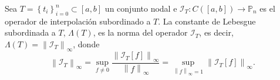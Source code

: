 \begin{frame}
	\begin{definition}
		Sea
		\begin{math}
			T=
			{
			\left\{
			t_{i}
			\right\}
			}^{n}_{i=0}
			\subset\left[a,b\right]
		\end{math}
		un conjunto nodal e
		\begin{math}
			\mathcal{I}_{T}:
			C\left(\left[a,b\right]\right)\to
			\mathbb{P}_{n}
		\end{math}
		es el operador de interpolación subordinado a $T$.
		La \alert{constante de Lebesgue subordinada a} $T$,
		$\Lambda\left(T\right)$, es la norma del operador
		$\mathcal{I}_{T}$, es
		decir,
		\begin{math}
			\Lambda\left(T\right)=
			{\left\|
			\mathcal{I}_{T}
			\right\|}_{\infty}
		\end{math},
		donde
		\begin{equation*}
			{\left\|
				\mathcal{I}_{T}
				\right\|}_{\infty}=
			\sup_{f\neq0}
			\dfrac{
				{\left\|
						\mathcal{I}_{T}
						\left[f\right]
						\right\|}_{\infty}
			}{
				{\left\|f\right\|}_{\infty}
			}=
			\sup_{
				{\left\|f\right\|}_{\infty}=1}
			\left\|
			\mathcal{I}_{T}
			\left[f\right]
			\right\|_{\infty}.
		\end{equation*}
	\end{definition}
\end{frame}

